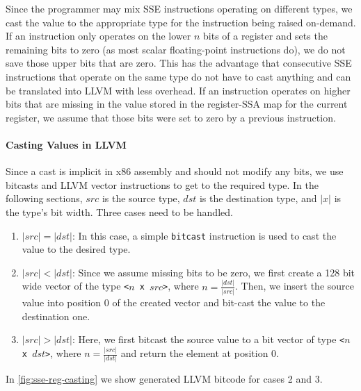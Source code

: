 Since the programmer may mix SSE instructions operating on different types, we cast the value to the appropriate type for the instruction being raised on-demand.
If an instruction only operates on the lower $n$ bits of a register and sets the remaining bits to zero (as most scalar floating-point instructions do), we do not save those upper bits that are zero.
This has the advantage that consecutive SSE instructions that operate on the same type do not have to cast anything and can be translated into LLVM with less overhead.
If an instruction operates on higher bits that are missing in the value stored in the register-SSA map for the current register, we assume that those bits were set to zero by a previous instruction.

\paragraph{Casting Values in LLVM} Since a cast is implicit in x86 assembly and should not modify any bits, we use bitcasts and LLVM vector instructions to get to the required type.
In the following sections, $src$ is the source type, $dst$ is the destination type, and $|x|$ is the type's bit width.
Three cases need to be handled.

\begin{enumerate}
    \item $|src| = |dst|$:
    In this case, a simple \texttt{bitcast} instruction is used to cast the value to the desired type.
    \item $|src| < |dst|$:
    Since we assume missing bits to be zero, we first create a 128 bit wide vector of the type \texttt{<$n$ x $src$>}, where $n = \frac{|dst|}{|src|}$.
    Then, we insert the source value into position 0 of the created vector and bit-cast the value to the destination one.
    \item $|src| > |dst|$:
    Here, we first bitcast the source value to a bit vector of type \texttt{<$n$ x $dst$>}, where $n = \frac{|src|}{|dst|}$ and return the element at position 0.
\end{enumerate}

In \cref{fig:sse-reg-casting} we show generated LLVM bitcode for cases 2 and 3.

